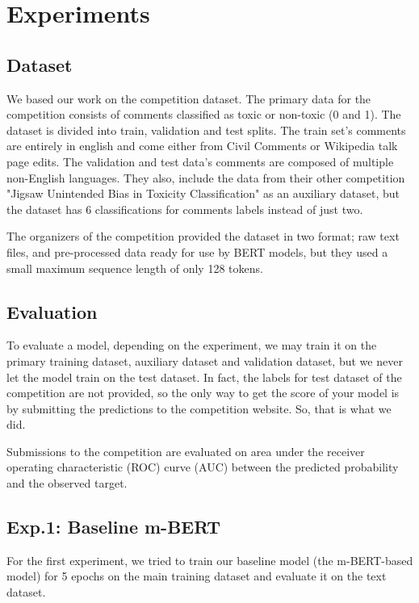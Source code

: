 \documentclass[10pt,twocolumn,letterpaper]{article}
\begin{document}
\section{Experiments}

\subsection{Dataset}
We based our work on the competition dataset. The primary data for the competition consists of comments classified as toxic or non-toxic (0 and 1). The dataset is divided into train, validation and test splits. The train set’s comments are entirely in english and come either from Civil Comments or Wikipedia talk page edits. The validation and test data's comments are composed of multiple non-English languages\cite{Jigsaw}. They also, include the data from their other competition "Jigsaw Unintended Bias in Toxicity Classification"\cite{Jigsaw2} as an auxiliary dataset, but the dataset has 6 classifications for comments labels instead of just two.

The organizers of the competition provided the dataset in two format; raw text files, and pre-processed data ready for use by BERT models, but they used a small maximum sequence length of only 128 tokens. 

\subsection{Evaluation}

To evaluate a model, depending on the experiment, we may train it on the primary training dataset, auxiliary dataset and validation dataset, but we never let the model train on the test dataset. In fact, the labels for test dataset of the competition are not provided, so the only way to get the score of your model is by submitting the predictions to the competition website. So, that is what we did.

Submissions to the competition are evaluated on area under the receiver operating characteristic (ROC) curve (AUC) between the predicted probability and the observed target. 


  
\subsection{Exp.1: Baseline m-BERT}

For the first experiment, we tried to train our baseline model (the m-BERT-based model) for 5 epochs on the main training dataset and evaluate it on the text dataset. 
\end{document}
